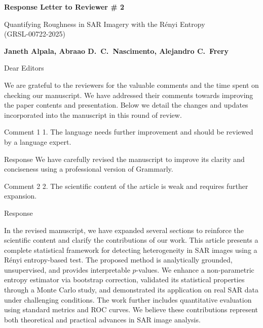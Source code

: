 \documentclass[11pt]{report}
\begin{document}
\begin{center}
\large{\textbf{Response Letter to Reviewer \# 2}}

\vglue 0.3cm

\huge{ Quantifying Roughness in SAR Imagery with the Rényi Entropy\\ (GRSL-00722-2025)}
\end{center}

\begin{center}
\textbf{Janeth Alpala,   Abraao D.\ C.\ Nascimento, Alejandro C.\ Frery }
\end{center}

\date{\today}



\vspace{0.5cm}
\noindent Dear Editors
\bigskip

\noindent We are grateful to the reviewers for the valuable comments and the time spent on checking our manuscript. 
We have addressed their comments towards improving the paper contents and presentation. 
Below we detail the changes and updates incorporated into the manuscript in this round of review.

\medskip


\vspace{2em}
\begin{reviewbox}{Comment 1}
1. The language needs further improvement and should be reviewed by a language expert.
\end{reviewbox}

\begin{responsebox}{Response}
We have carefully revised the manuscript to improve its clarity and conciseness using a professional version of Grammarly.

\end{responsebox}

\vspace{3em}
\begin{reviewbox}{Comment 2}
2. The scientific content of the article is weak and requires further expansion.
\end{reviewbox}

\begin{responsebox}{Response}

In the revised manuscript, we have expanded several sections to reinforce the scientific content and clarify the contributions of our work. 
This article presents a complete statistical framework for detecting heterogeneity in SAR images using a Rényi entropy-based test. 
The proposed method is analytically grounded, unsupervised, and provides interpretable $p$-values. 
We enhance a non-parametric entropy estimator via bootstrap correction, validated its statistical properties through a Monte Carlo study, and demonstrated its application on real SAR data under challenging conditions. 
The work further includes quantitative evaluation using standard metrics and ROC curves. We believe these contributions represent both theoretical and practical advances in SAR image analysis.

\end{responsebox}
\end{document}
